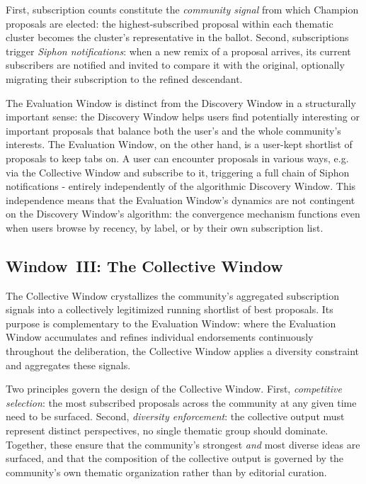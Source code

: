 \documentclass[a4paper, 12pt, twoside]{iviathesis}
\begin{document}
First, subscription counts constitute the \textit{community signal} from which Champion proposals are elected: the highest-subscribed proposal within each thematic cluster becomes the cluster's representative in the ballot. Second, subscriptions trigger \textit{Siphon notifications}: when a new remix of a proposal arrives, its current subscribers are notified and invited to compare it with the original, optionally migrating their subscription to the refined descendant.

The Evaluation Window is distinct from the Discovery Window in a structurally important sense: the Discovery Window helps users find potentially interesting or important proposals that balance both the user's and the whole community's interests. The Evaluation Window, on the other hand, is a user-kept shortlist of proposals to keep tabs on. A user can encounter proposals in various ways, e.g. via the Collective Window and subscribe to it, triggering a full chain of Siphon notifications - entirely independently of the algorithmic Discovery Window. This independence means that the Evaluation Window's dynamics are not contingent on the Discovery Window's algorithm: the convergence mechanism functions even when users browse by recency, by label, or by their own subscription list.

\subsection{Window~III: The Collective Window}
\label{sec:collective-window}

The Collective Window crystallizes the community's aggregated subscription signals into a collectively legitimized running shortlist of best proposals. Its purpose is complementary to the Evaluation Window: where the Evaluation Window accumulates and refines individual endorsements continuously throughout the deliberation, the Collective Window applies a diversity constraint and aggregates these signals.

Two principles govern the design of the Collective Window. First, \textit{competitive selection}: the most subscribed proposals across the community at any given time need to be surfaced. Second, \textit{diversity enforcement}: the collective output must represent distinct perspectives, no single thematic group should dominate. Together, these ensure that the community's strongest \textit{and} most diverse ideas are surfaced, and that the composition of the collective output is governed by the community's own thematic organization rather than by editorial curation.
\end{document}
